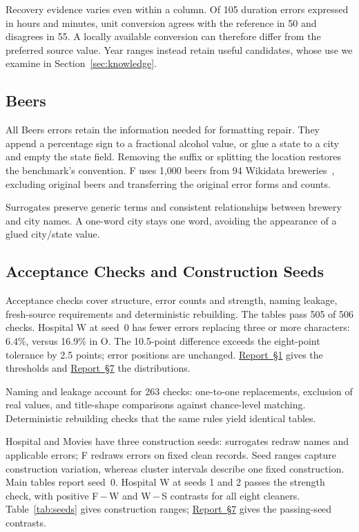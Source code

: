 \documentclass[sigconf, nonacm]{acmart}
\newcommand{\companionref}[1]{\href{https://github.com/hinsonver/CoRe-Benchmark/raw/refs/heads/main/paper/CoRe-Supplementary-Technical-Report.pdf\#nameddest=companion-#1}{Report~\S#1}}
\begin{document}
Recovery evidence varies even within a column. Of 105 duration errors expressed in hours and
minutes, unit conversion agrees with the reference in 50 and disagrees in 55. A locally available
conversion can therefore differ from the preferred source value. Year ranges instead retain
useful candidates, whose use we examine in Section~\ref{sec:knowledge}.

\subsection{Beers}\label{sec:build-beers}

All Beers errors retain the information needed for formatting repair. They append a percentage
sign to a fractional alcohol value, or glue a state to a city and empty the state field. Removing
the suffix or splitting the location restores the benchmark's convention. F uses 1,000 beers
from 94 Wikidata breweries~\cite{vrandecic2014wikidata}, excluding original beers and transferring
the original error forms and counts.

Surrogates preserve generic terms and consistent relationships between brewery and city names.
A one-word city stays one word, avoiding the appearance of a glued city/state value.

\subsection{Acceptance Checks and Construction Seeds}\label{sec:acceptance}\label{sec:naming}

Acceptance checks cover structure, error counts and strength, naming leakage, fresh-source
requirements and deterministic rebuilding. The tables pass 505 of 506 checks. Hospital W at
seed~0 has fewer errors replacing three or more characters: 6.4\%, versus 16.9\% in O.
The 10.5-point difference exceeds the eight-point tolerance by 2.5 points; error positions
are unchanged. \companionref{1} gives the thresholds and \companionref{7} the distributions.

Naming and leakage account for 263 checks: one-to-one replacements, exclusion of real values,
and title-shape comparisons against chance-level matching. Deterministic rebuilding checks
that the same rules yield identical tables.

Hospital and Movies have three construction seeds: surrogates redraw names and applicable
errors; F redraws errors on fixed clean records. Seed ranges capture construction variation,
whereas cluster intervals describe one fixed construction. Main tables report seed~0.
Hospital W at seeds 1 and 2 passes the strength check, with positive F\,$-$\,W and
W\,$-$\,S contrasts for all eight cleaners. Table~\ref{tab:seeds} gives construction ranges;
\companionref{7} gives the passing-seed contrasts.
\end{document}
